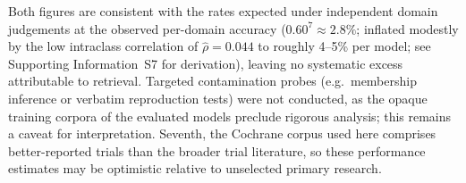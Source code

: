 \documentclass[../main.tex]{subfiles}
\begin{document}
Both figures are consistent with the rates expected under independent domain
judgements at the observed per-domain accuracy ($0.60^7 \approx 2.8\%$; inflated
modestly by the low intraclass correlation of $\hat\rho = 0.044$ to roughly
4--5\% per model; see Supporting Information~S7 for derivation), leaving no systematic excess attributable to retrieval.
Targeted contamination probes (e.g.\ membership inference or verbatim
reproduction tests) were not conducted, as the opaque training corpora of the
evaluated models preclude rigorous analysis; this remains a caveat for
interpretation.
Seventh, the Cochrane corpus used here comprises better-reported trials than the
broader trial literature, so these performance estimates may be optimistic
relative to unselected primary research.
\end{document}
